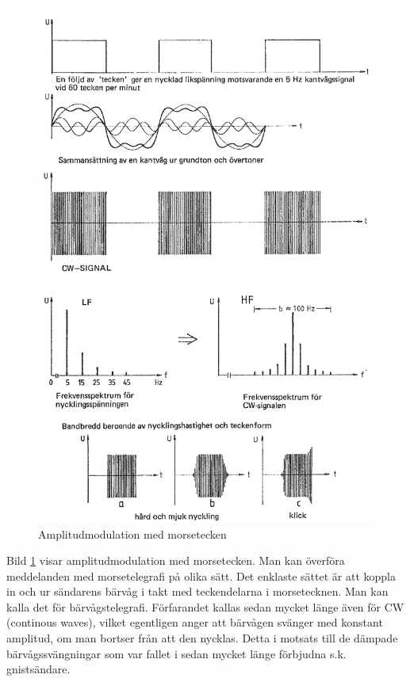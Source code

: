 \begin{figure}
\includegraphics[width=\textwidth]{images/cropped_pdfs/bild_2_1-26.pdf}
\caption{Amplitudmodulation med morsetecken}
\label{fig:BildII1-26}
\end{figure}

Bild \ref{fig:BildII1-26} visar amplitudmodulation med morsetecken.
Man kan överföra meddelanden med morsetelegrafi på olika sätt.
Det enklaste sättet är att koppla in och ur sändarens bärvåg i takt med
teckendelarna i morsetecknen.
Man kan kalla det för bärvågstelegrafi.
Förfarandet kallas sedan mycket länge även för CW (continous waves), vilket
egentligen anger att bärvågen svänger med konstant amplitud, om man bortser
från att den nycklas.
Detta i motsats till de dämpade bärvågssvängningar som var fallet i sedan
mycket länge förbjudna s.k. gnistsändare.

